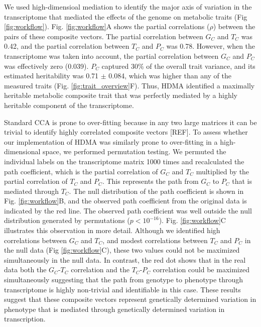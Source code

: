 \documentclass[
]{article}
\begin{document}
We used high-dimensioal mediation to identify the major axis of
variation in the transcriptome that mediated the effects of the genome
on metabolic traits (Fig \ref{fig:workflow}). Fig. \ref{fig:workflow}A
shows the partial correlations (\(\rho\)) between the pairs of these
composite vectors. The partial correlation between \(G_C\) and \(T_C\)
was 0.42, and the partial correlation between \(T_C\) and \(P_C\) was
0.78. However, when the transcriptome was taken into account, the
partial correlation between \(G_C\) and \(P_C\) was effectively zero
(0.039). \(P_C\) captured 30\% of the overall trait variance, and its
estimated heritability was 0.71 \(\pm\) 0.084, which was higher than any
of the measured traits (Fig. \ref{fig:trait_overview}F). Thus, HDMA
identified a maximally heritable metabolic composite trait that was
perfectly mediated by a highly heritable component of the transcriptome.

Standard CCA is prone to over-fitting because in any two large matrices
it can be trivial to identify highly correlated composite vectors
{[}REF{]}. To assess whether our implementation of HDMA was similarly
prone to over-fitting in a high-dimensional space, we performed
permutation testing. We permuted the individual labels on the
transcriptome matrix 1000 times and recalculated the path coefficient,
which is the partial correlation of \(G_C\) and \(T_C\) multiplied by
the partial correlation of \(T_C\) and \(P_C\). This represents the path
from \(G_C\) to \(P_C\) that is mediated through \(T_C\). The null
distribution of the path coefficient is shown in Fig.
\ref{fig:workflow}B, and the observed path coefficient from the original
data is indicated by the red line. The observed path coefficient was
well outside the null distribution generated by permutations
(\(p < 10^{-16}\)). Fig. \ref{fig:workflow}C illustrates this
observation in more detail. Although we identified high correlations
between \(G_C\) and \(T_C\), and modest correlations between \(T_C\) and
\(P_C\) in the null data (Fig \ref{fig:workflow}C), these two values
could not be maximized simultaneously in the null data. In contrast, the
red dot shows that in the real data both the \(G_C\)-\(T_C\) correlation
and the \(T_C\)-\(P_C\) correlation could be maximized simultaneously
suggesting that the path from genotype to phenotype through
transcriptome is highly non-trivial and identifiable in this case. These
results suggest that these composite vectors represent genetically
determined variation in phenotype that is mediated through genetically
determined variation in transcription.
\end{document}
